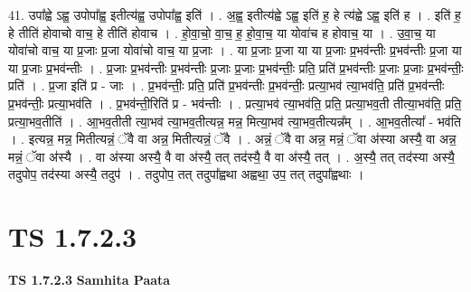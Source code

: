\documentclass[17pt]{extarticle}
\begin{document}
41. उपा᳚ह्वे ऽह्व॒ उपोपा᳚ह्व॒ इतीत्य॑ह्व॒ उपोपा᳚ह्व॒ इति॑ । . अ॒ह्व॒ इतीत्य॑ह्वे ऽह्व॒ इति॑ ह॒ हे त्य॑ह्वे ऽह्व॒ इति॑ ह । . इति॑ ह॒ हे तीति॑ होवाचो वाच॒ हे तीति॑ होवाच । . हो॒वा॒चो॒ वा॒च॒ ह॒ हो॒वा॒च॒ या योवा॑च ह होवाच॒ या । . उ॒वा॒च॒ या योवा॑चो वाच॒ या प्र॒जाः प्र॒जा योवा॑चो वाच॒ या प्र॒जाः । . या प्र॒जाः प्र॒जा या या प्र॒जाः प्र॒भव॑न्तीः प्र॒भव॑न्तीः प्र॒जा या या प्र॒जाः प्र॒भव॑न्तीः । . प्र॒जाः प्र॒भव॑न्तीः प्र॒भव॑न्तीः प्र॒जाः प्र॒जाः प्र॒भव॑न्तीः॒ प्रति॒ प्रति॑ प्र॒भव॑न्तीः प्र॒जाः प्र॒जाः प्र॒भव॑न्तीः॒ प्रति॑ । . प्र॒जा इति॑ प्र - जाः । . प्र॒भव॑न्तीः॒ प्रति॒ प्रति॑ प्र॒भव॑न्तीः प्र॒भव॑न्तीः॒ प्रत्या॒भव॑ त्या॒भव॑ति॒ प्रति॑ प्र॒भव॑न्तीः प्र॒भव॑न्तीः॒ प्रत्या॒भव॑ति । . प्र॒भव॑न्ती॒रिति॑ प्र - भव॑न्तीः । . प्रत्या॒भव॑ त्या॒भव॑ति॒ प्रति॒ प्रत्या॒भव॒ती तीत्या॒भव॑ति॒ प्रति॒ प्रत्या॒भव॒तीति॑ । . आ॒भव॒तीती त्या॒भव॑ त्या॒भव॒तीत्यन्न॒ मन्न॒ मित्या॒भव॑ त्या॒भव॒तीत्यन्न᳚म् । . आ॒भव॒तीत्या᳚ - भव॑ति । . इत्यन्न॒ मन्न॒ मितीत्यन्नं॒ ॅवै वा अन्न॒ मितीत्यन्नं॒ ॅवै । . अन्नं॒ ॅवै वा अन्न॒ मन्नं॒ ॅवा अ॑स्या अस्यै॒ वा अन्न॒ मन्नं॒ ॅवा अ॑स्यै । . वा अ॑स्या अस्यै॒ वै वा अ॑स्यै॒ तत् तद॑स्यै॒ वै वा अ॑स्यै॒ तत् । . अ॒स्यै॒ तत् तद॑स्या अस्यै॒ तदुपोप॒ तद॑स्या अस्यै॒ तदुप॑ । . तदुपोप॒ तत् तदुपा᳚ह्वथा अह्वथा॒ उप॒ तत् तदुपा᳚ह्वथाः । \newline
\pagebreak
{}

\section{ TS 1.7.2.3 }

\textbf{TS 1.7.2.3 } \newline
\textbf{Samhita Paata} \newline
\end{document}
